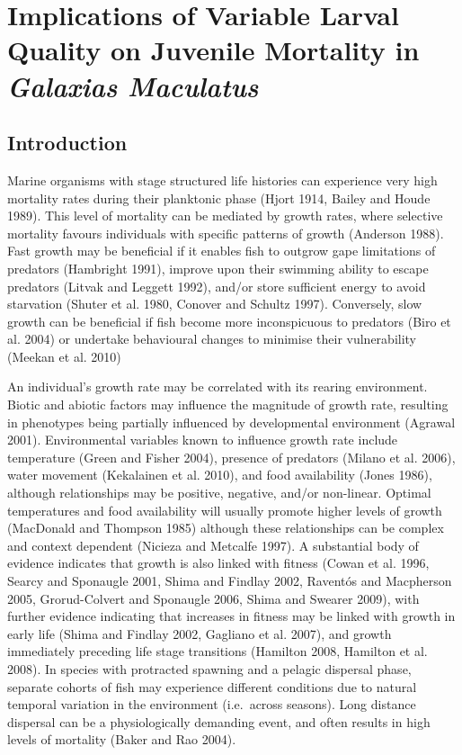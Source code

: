 \documentclass[]{book}
\begin{document}
\chapter{\texorpdfstring{Implications of Variable Larval Quality on
Juvenile Mortality in \emph{Galaxias
Maculatus}}{Implications of Variable Larval Quality on Juvenile Mortality in Galaxias Maculatus}}\label{implications-of-variable-larval-quality-on-juvenile-mortality-in-galaxias-maculatus}

\section{Introduction}\label{introduction-2}

Marine organisms with stage structured life histories can experience
very high mortality rates during their planktonic phase (Hjort 1914,
Bailey and Houde 1989). This level of mortality can be mediated by
growth rates, where selective mortality favours individuals with
specific patterns of growth (Anderson 1988). Fast growth may be
beneficial if it enables fish to outgrow gape limitations of predators
(Hambright 1991), improve upon their swimming ability to escape
predators (Litvak and Leggett 1992), and/or store sufficient energy to
avoid starvation (Shuter et al. 1980, Conover and Schultz 1997).
Conversely, slow growth can be beneficial if fish become more
inconspicuous to predators (Biro et al. 2004) or undertake behavioural
changes to minimise their vulnerability (Meekan et al. 2010)

An individual's growth rate may be correlated with its rearing
environment. Biotic and abiotic factors may influence the magnitude of
growth rate, resulting in phenotypes being partially influenced by
developmental environment (Agrawal 2001). Environmental variables known
to influence growth rate include temperature (Green and Fisher 2004),
presence of predators (Milano et al. 2006), water movement (Kekalainen
et al. 2010), and food availability (Jones 1986), although relationships
may be positive, negative, and/or non-linear. Optimal temperatures and
food availability will usually promote higher levels of growth
(MacDonald and Thompson 1985) although these relationships can be
complex and context dependent (Nicieza and Metcalfe 1997). A substantial
body of evidence indicates that growth is also linked with fitness
(Cowan et al. 1996, Searcy and Sponaugle 2001, Shima and Findlay 2002,
Raventós and Macpherson 2005, Grorud-Colvert and Sponaugle 2006, Shima
and Swearer 2009), with further evidence indicating that increases in
fitness may be linked with growth in early life (Shima and Findlay 2002,
Gagliano et al. 2007), and growth immediately preceding life stage
transitions (Hamilton 2008, Hamilton et al. 2008). In species with
protracted spawning and a pelagic dispersal phase, separate cohorts of
fish may experience different conditions due to natural temporal
variation in the environment (i.e.~across seasons). Long distance
dispersal can be a physiologically demanding event, and often results in
high levels of mortality (Baker and Rao 2004).
\end{document}
